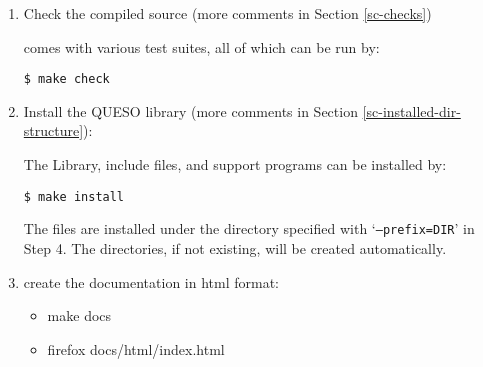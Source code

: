 \begin{enumerate}
\item {Check the compiled source (more comments in Section \ref{sc-checks})%

\Queso{} comes with various test suites, all of which can be run by:
\begin{verbatim}
$ make check
\end{verbatim}
}

\item {Install the QUESO library (more comments in Section \ref{sc-installed-dir-structure}): %

The \Queso{} Library, include files, and support programs can be installed by: %
\begin{verbatim}
$ make install 
\end{verbatim}}

The files are installed under the directory specified with `\texttt{--prefix=DIR}' in Step 4. The directories, if not existing, will be
        created automatically.%

\item {create the documentation in html format: %
\begin{itemize}
\item make docs
\item firefox docs/html/index.html
\end{itemize}
}
\end{enumerate}


